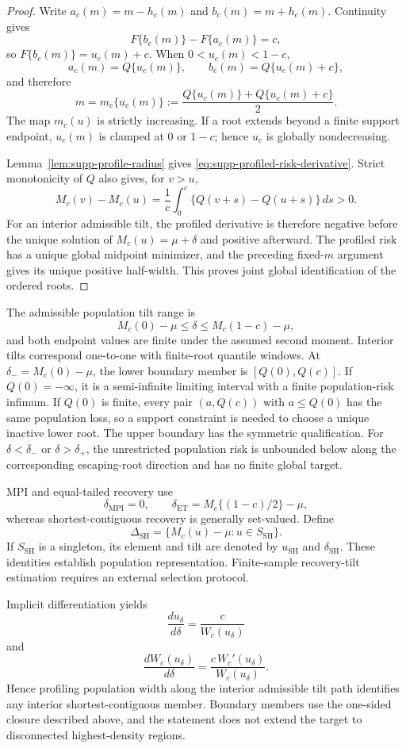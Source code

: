 \documentclass[11pt]{article}
\begin{document}
\begin{proof}
Write \(a_c(m)=m-h_c(m)\) and \(b_c(m)=m+h_c(m)\). Continuity gives
\[
F\{b_c(m)\}-F\{a_c(m)\}=c,
\]
so \(F\{b_c(m)\}=u_c(m)+c\). When \(0<u_c(m)<1-c\),
\[
a_c(m)=Q\{u_c(m)\},\qquad
b_c(m)=Q\{u_c(m)+c\},
\]
and therefore
\[
m=m_c\{u_c(m)\}
:=\frac{Q\{u_c(m)\}+Q\{u_c(m)+c\}}{2}.
\]
The map \(m_c(u)\) is strictly increasing. If a root extends beyond a finite
support endpoint, \(u_c(m)\) is clamped at \(0\) or \(1-c\); hence \(u_c\) is
globally nondecreasing.

Lemma~\ref{lem:supp-profile-radius} gives
\eqref{eq:supp-profiled-risk-derivative}. Strict monotonicity of \(Q\) also
gives, for \(v>u\),
\[
M_c(v)-M_c(u)
=\frac{1}{c}\int_0^c\{Q(v+s)-Q(u+s)\}\,ds>0.
\]
For an interior admissible tilt, the profiled derivative is therefore negative
before the unique solution of \(M_c(u)=\mu+\delta\) and positive afterward.
The profiled risk has a unique global midpoint minimizer, and the preceding
fixed-\(m\) argument gives its unique positive half-width. This proves joint
global identification of the ordered roots.
\end{proof}

The admissible population tilt range is
\[
M_c(0)-\mu\le\delta\le M_c(1-c)-\mu,
\]
and both endpoint values are finite under the assumed second moment. Interior
tilts correspond one-to-one with finite-root quantile windows. At
\(\delta_- = M_c(0)-\mu\), the lower boundary member is
\([Q(0),Q(c)]\). If \(Q(0)=-\infty\), it is a semi-infinite limiting interval
with a finite population-risk infimum. If \(Q(0)\) is finite, every pair
\((a,Q(c))\) with
\(a\le Q(0)\) has the same population loss, so a support constraint is needed
to choose a unique inactive lower root. The upper boundary has the symmetric
qualification. For
\(\delta<\delta_-\) or \(\delta>\delta_+\), the unrestricted population risk
is unbounded below along the corresponding escaping-root direction and has no
finite global target.

MPI and equal-tailed recovery use
\[
\delta_{\mathrm{MPI}}=0,\qquad
\delta_{\mathrm{ET}}=M_c\{(1-c)/2\}-\mu,
\]
whereas shortest-contiguous recovery is generally set-valued. Define
\[
\Delta_{\mathrm{SH}}
=
\{M_c(u)-\mu:u\in S_{\mathrm{SH}}\}.
\]
If \(S_{\mathrm{SH}}\) is a singleton, its element and tilt are denoted
by \(u_{\mathrm{SH}}\) and \(\delta_{\mathrm{SH}}\). These identities establish
population representation. Finite-sample recovery-tilt estimation requires an
external selection protocol.

Implicit differentiation yields
\[
\frac{du_\delta}{d\delta}
=\frac{c}{W_c(u_\delta)}
\]
and
\[
\frac{dW_c(u_\delta)}{d\delta}
=\frac{c\,W_c'(u_\delta)}{W_c(u_\delta)}.
\]
Hence profiling population width along the interior admissible tilt path
identifies any interior shortest-contiguous member. Boundary members use the
one-sided closure described above, and the statement does not extend
the target to disconnected highest-density regions.
\end{document}
